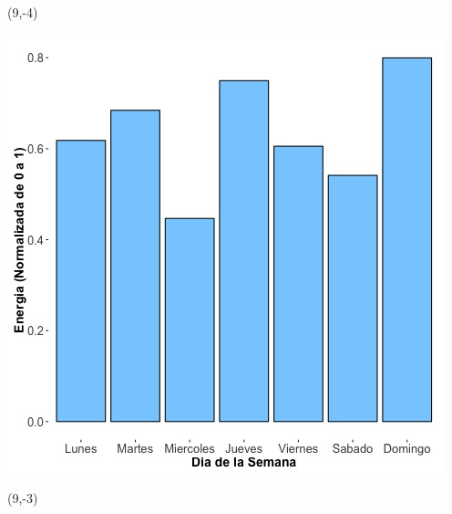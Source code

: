 \documentclass{article}\usepackage[]{graphicx}\usepackage[]{color}
\newenvironment{knitrout}{}{} %
\begin{document}
 \begin{textblock}{1}(9,-4)
\begin{minipage}{20em}
\begingroup

\endgroup
\end{minipage}
\end{textblock}


\begin{knitrout}
\color{fgcolor}
\includegraphics[scale=0.65]{figure/A3_day_of_week_plot} 
\end{knitrout}


 \begin{textblock}{1}(9,-3)
\begin{minipage}{20em}
\begingroup

\endgroup
\end{minipage}
\end{textblock}

 \vspace{2cm}
\end{document}
